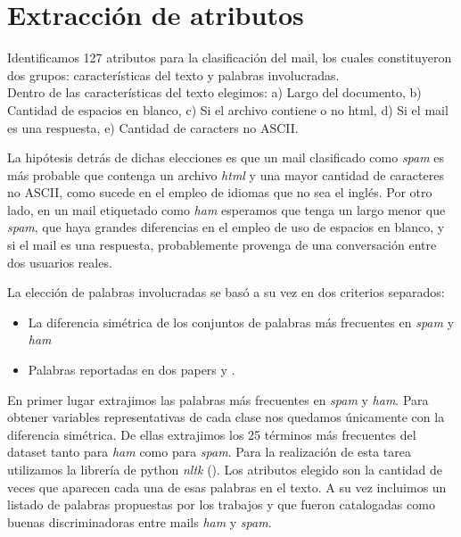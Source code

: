 \documentclass[a4paper,10pt]{article}
\begin{document}
\section{Extracci\'on de atributos} \label{sec:extraccion}

\par Identificamos 127 atributos para la clasificación del mail, los cuales constituyeron dos grupos: características del texto y palabras involucradas. \\

Dentro de las características del texto elegimos: a) Largo del documento, b) Cantidad de espacios en blanco, c) Si el archivo contiene o no html, d) Si el mail es una respuesta, e) Cantidad de caracters no ASCII.

La hipótesis detrás de dichas elecciones es que un mail clasificado como \emph{spam} es más probable que contenga un archivo \emph{html} y una mayor cantidad de caracteres no ASCII, como sucede en el empleo de idiomas que no sea el inglés. Por otro lado, en un mail etiquetado como \emph{ham} esperamos que tenga un largo menor que \emph{spam}, que haya grandes diferencias en el empleo de uso de espacios en blanco, y si el mail es una respuesta, probablemente provenga de una conversación entre dos usuarios reales.

\par La elección de palabras involucradas se basó a su vez en dos criterios separados: 
\begin{itemize}
 \item La diferencia sim\'etrica de los conjuntos de palabras m\'as frecuentes en \emph{spam} y \emph{ham}
\item Palabras reportadas en dos papers \cite{Gunal} y \cite{Vaughan}. 
\end{itemize}

En primer lugar extrajimos las palabras m\'as frecuentes en \emph{spam} y \emph{ham}. Para obtener variables representativas de cada clase nos quedamos \'unicamente con la diferencia sim\'etrica. De ellas extrajimos los 25 términos más frecuentes del dataset tanto para \emph{ham} como para \emph{spam}. Para la realización de esta tarea utilizamos la librería de python \emph{nltk} (\cite{nltk}). Los atributos elegido son la cantidad de veces que aparecen cada una de esas palabras en el texto. 
A su vez incluimos un listado de palabras propuestas por los trabajos \cite{Gunal} y \cite{Vaughan} que fueron catalogadas como buenas discriminadoras entre mails \emph{ham} y \emph{spam}. 
\end{document}
